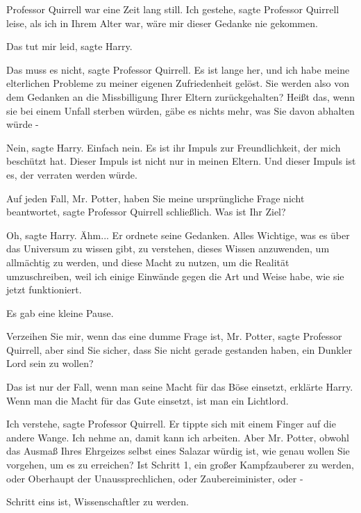 Professor Quirrell war eine Zeit lang still. \glqq Ich gestehe\grqq{}, sagte
Professor Quirrell leise, \glqq als ich in Ihrem Alter war, wäre mir dieser
Gedanke nie gekommen.\grqq{}

\glqq Das tut mir leid\grqq{}, sagte Harry.

\glqq Das muss es nicht\grqq{}, sagte Professor Quirrell. \glqq Es ist lange
her, und ich habe meine elterlichen Probleme zu meiner eigenen Zufriedenheit
gelöst. Sie werden also von dem Gedanken an die Missbilligung Ihrer Eltern
zurückgehalten? Heißt das, wenn sie bei einem Unfall sterben würden, gäbe es
nichts mehr, was Sie davon abhalten würde -\grqq{}

\glqq Nein\grqq{}, sagte Harry. \glqq Einfach nein. Es ist ihr Impuls zur
Freundlichkeit, der mich beschützt hat. Dieser Impuls ist nicht nur in meinen
Eltern. Und dieser Impuls ist es, der verraten werden würde.\grqq{}

\glqq Auf jeden Fall, Mr. Potter, haben Sie meine ursprüngliche Frage nicht
beantwortet\grqq{}, sagte Professor Quirrell schließlich. \glqq Was ist Ihr
Ziel?\grqq{}

\glqq Oh\grqq{}, sagte Harry. \glqq Ähm...\grqq{} Er ordnete seine Gedanken.
\glqq Alles Wichtige, was es über das Universum zu wissen gibt, zu verstehen,
dieses Wissen anzuwenden, um allmächtig zu werden, und diese Macht zu nutzen, um
die Realität umzuschreiben, weil ich einige Einwände gegen die Art und Weise
habe, wie sie jetzt funktioniert.\grqq{}

Es gab eine kleine Pause.

\glqq Verzeihen Sie mir, wenn das eine dumme Frage ist, Mr. Potter\grqq{},
sagte Professor Quirrell, \glqq aber sind Sie sicher, dass Sie nicht gerade
gestanden haben, ein Dunkler Lord sein zu wollen?\grqq{}

\glqq Das ist nur der Fall, wenn man seine Macht für das Böse einsetzt\grqq{},
erklärte Harry. \glqq Wenn man die Macht für das Gute einsetzt, ist man ein
Lichtlord.\grqq{}

\glqq Ich verstehe\grqq{}, sagte Professor Quirrell. Er tippte sich mit einem
Finger auf die andere Wange. \glqq Ich nehme an, damit kann ich arbeiten. Aber
Mr. Potter, obwohl das Ausmaß Ihres Ehrgeizes selbst eines Salazar würdig ist,
wie genau wollen Sie vorgehen, um es zu erreichen? Ist Schritt 1, ein großer
Kampfzauberer zu werden, oder Oberhaupt der Unaussprechlichen, oder
Zaubereiminister, oder -\grqq{}

\glqq Schritt eins ist, Wissenschaftler zu werden.\grqq{}

